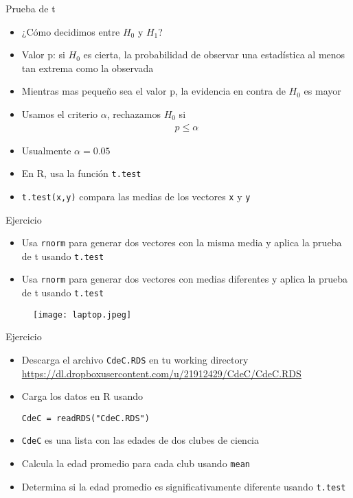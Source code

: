\documentclass{beamer}
\begin{document}
\begin{frame}[fragile]{Prueba de t}
\begin{itemize}
\item ¿Cómo decidimos entre $H_0$ y $H_1$?
\item Valor p: si $H_0$ es cierta, la probabilidad de observar una estadística al menos tan extrema como la observada
\item Mientras mas pequeño sea el valor p, la evidencia en contra de $H_0$ es mayor
\item Usamos el criterio $\alpha$, rechazamos $H_0$ si
\begin{align*}
p \leq \alpha
\end{align*}
\item Usualmente $\alpha=0.05$
\item En R, usa la función \verb=t.test= 
\item \texttt{t.test(x,y)} compara las medias de los vectores \verb=x= y \verb=y=
\end{itemize}
\end{frame}


\begin{frame}[fragile]
\begin{block}{Ejercicio}
\begin{itemize}
\item Usa \verb=rnorm= para generar dos vectores con la misma media y aplica la prueba de t usando \verb=t.test=
\item Usa \verb=rnorm= para generar dos vectores con medias diferentes y aplica la prueba de t usando \verb=t.test=
\end{itemize}
\end{block}
\begin{figure}[H]
\centering
\texttt{[image: laptop.jpeg]}
\end{figure}
\end{frame}

\begin{frame}[fragile]
\begin{block}{Ejercicio}
\begin{itemize}
\item Descarga el archivo \verb=CdeC.RDS= en tu working directory
{\small \url{https://dl.dropboxusercontent.com/u/21912429/CdeC/CdeC.RDS}}
\item Carga los datos en R usando
\begin{verbatim}
CdeC = readRDS("CdeC.RDS")
\end{verbatim}
\item \verb=CdeC= es una lista con las edades de dos clubes de ciencia
\item Calcula la edad promedio para cada club usando \verb=mean=
\item Determina si la edad promedio es significativamente diferente usando \verb=t.test=
\end{itemize}
\end{block}
\end{frame}
\end{document}

